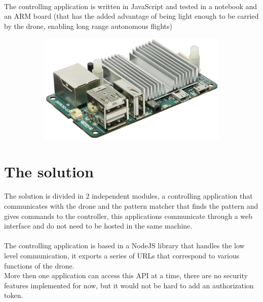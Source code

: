 \documentclass[11pt,twoside,a4paper]{article}
\begin{document}
\paragraph {} The controlling application is written in JavaScript and tested
in a notebook and an ARM board (that has the added advantage of being light
enough to be carried by the drone, enabling long range autonomous flights)
\begin{figure}[hbtp]
  \centering
\begin{subfigure}{.99\textwidth}
  \centering
  \includegraphics[width=.8\linewidth]{odroid.jpg}
\end{subfigure}
\end{figure}

\section{The solution}
\paragraph {} The solution is divided in 2 independent modules, a controlling
application that communicates with the drone and the pattern matcher that
finds the pattern and gives commands to the controller, this applications
communicate through a web interface and do not need to be hosted in the same
machine.
\paragraph {} The controlling application is based in a NodeJS library that
handles the low level communication, it exports a series of URLs that correspond
to various functions of the drone.\\More then one application can access this
API at a time, there are no security features implemented for now, but it
would not be hard to add an authorization token.
\end{document}
